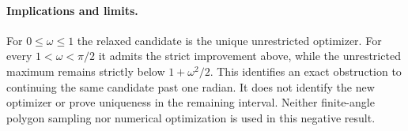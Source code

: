\documentclass[11pt]{article}
\begin{document}
\paragraph{Implications and limits.}
For $0\le\omega\le1$ the relaxed candidate is the unique unrestricted optimizer. For every $1<\omega<\pi/2$ it admits the strict improvement above, while the unrestricted maximum remains strictly below $1+\omega^2/2$. This identifies an exact obstruction to continuing the same candidate past one radian. It does not identify the new optimizer or prove uniqueness in the remaining interval. Neither finite-angle polygon sampling nor numerical optimization is used in this negative result.
\end{document}
